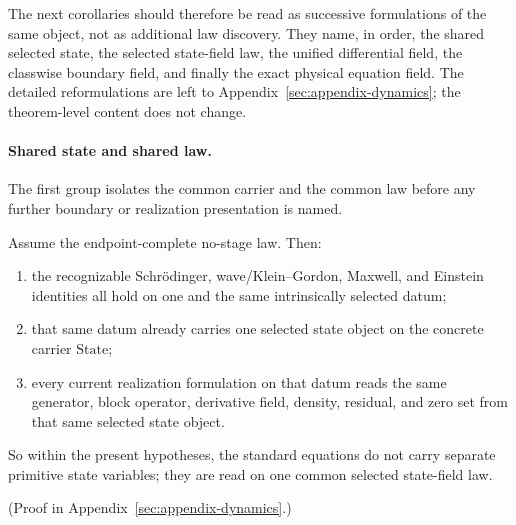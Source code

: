 The next corollaries should therefore be read as successive formulations of the
same object, not as additional law discovery. They name,
in order, the shared selected state, the selected state-field law, the unified
differential field, the classwise boundary field, and finally the exact
physical equation field. The detailed reformulations are left to
Appendix~\ref{sec:appendix-dynamics}; the theorem-level content does not change.

\paragraph{Shared state and shared law.}
The first group isolates the common carrier and the common law before any
further boundary or realization presentation is named.

\begin{corollary}
\label{cor:endpoint-complete-no-stage-law-puts-the-flagship-equations-on-one-shared-selected-state}
Assume the endpoint-complete no-stage law. Then:
\begin{enumerate}[label=(\roman*), leftmargin=2em, itemsep=0.2em]
\item the recognizable Schr\"odinger, wave/Klein--Gordon, Maxwell, and
      Einstein identities all hold on one and the same intrinsically selected
      datum;
\item that same datum already carries one selected state object on the
      concrete carrier \(\mathrm{State}\);
\item every current realization formulation on that datum reads the same
      generator, block operator, derivative field, density, residual, and
      zero set from that same selected state object.
\end{enumerate}
So within the present hypotheses, the standard equations do not carry
separate primitive state variables; they are read on one common selected
state-field law.
\end{corollary}

(Proof in Appendix~\ref{sec:appendix-dynamics}.)

